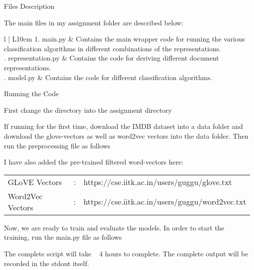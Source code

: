 \documentclass{article}
\begin{document}
\begin{qsection}{Files Description}

	The main files in my assignment folder are described below:

	\begin{tabular}{l | L{10cm}}
		1. main.py				& Contains  the  main	wrapper  code  for	running  the various	 classification   algorithms  in   different combinations of the representations. \\ . representation.py	& Contains the  code  for deriving  different	document representations. \\ . model.py			 	& Contains  the  code	for   different   classification algorithms. \\
	\end{tabular}

\end{qsection}


\begin{qsection}{Running the Code}

	First change the directory into the assignment directory


	If running for the first time, download the IMDB dataset into a data folder  and download the glove-vectors as well as word2vec vectors	into  the  data  folder.  Then run the preprocessing file as follows


	I have also added the pre-trained filtered word-vectors here:

	\begin{tabular}{l c l}
		GLoVE Vectors	 & : & https://cse.iitk.ac.in/users/guggu/glove.txt \\
		Word2Vec Vectors & : & https://cse.iitk.ac.in/users/guggu/word2vec.txt
	\end{tabular}

	Now, we are ready to train and evaluate the  models.   In  order  to  start  the training, run the main.py file as follows


	The complete script will take ~ 4 hours to complete. The complete output will be recorded in the stdout itself.

\end{qsection}
\end{document}
